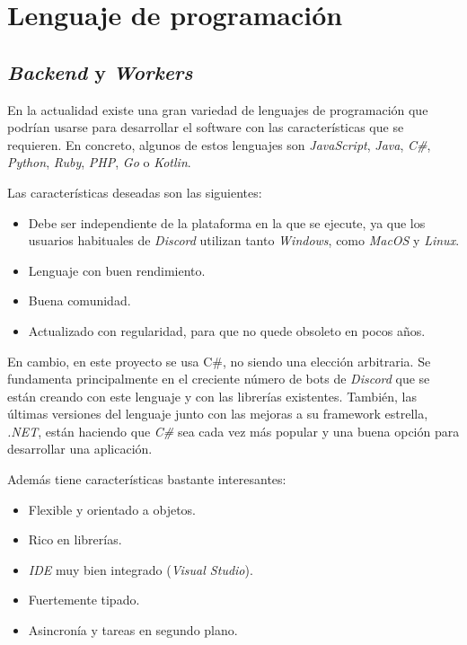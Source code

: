 \section{Lenguaje de programación}

\subsection{\textit{Backend} y \textit{Workers}}

En la actualidad existe una gran variedad de lenguajes de programación que podrían usarse para desarrollar el software con las características que se requieren. En concreto, algunos de estos lenguajes son \textit{JavaScript}, \textit{Java}, \textit{C\#}, \textit{Python}, \textit{Ruby}, \textit{PHP}, \textit{Go} o \textit{Kotlin}.

Las características deseadas son las siguientes:

\begin{itemize}
	\item Debe ser independiente de la plataforma en la que se ejecute, ya que los usuarios habituales de \textit{Discord} utilizan tanto \textit{Windows}, como \textit{MacOS} y \textit{Linux}.
	\item Lenguaje con buen rendimiento.
	\item Buena comunidad.
	\item Actualizado con regularidad, para que no quede obsoleto en pocos años.
\end{itemize}

En cambio, en este proyecto se usa C\#, no siendo una elección arbitraria. Se fundamenta principalmente en el creciente número de bots de \textit{Discord} que se están creando con este lenguaje y con las librerías existentes. También, las últimas versiones del lenguaje junto con las mejoras a su framework estrella, \textit{.NET}, están haciendo que \textit{C\#} sea cada vez más popular y una buena opción para desarrollar una aplicación.

Además tiene características bastante interesantes:

\begin{itemize}
	\item Flexible y orientado a objetos.
	\item Rico en librerías.
	\item \textit{IDE} muy bien integrado (\textit{Visual Studio}).
	\item Fuertemente tipado.
	\item Asincronía y tareas en segundo plano.
\end{itemize}

